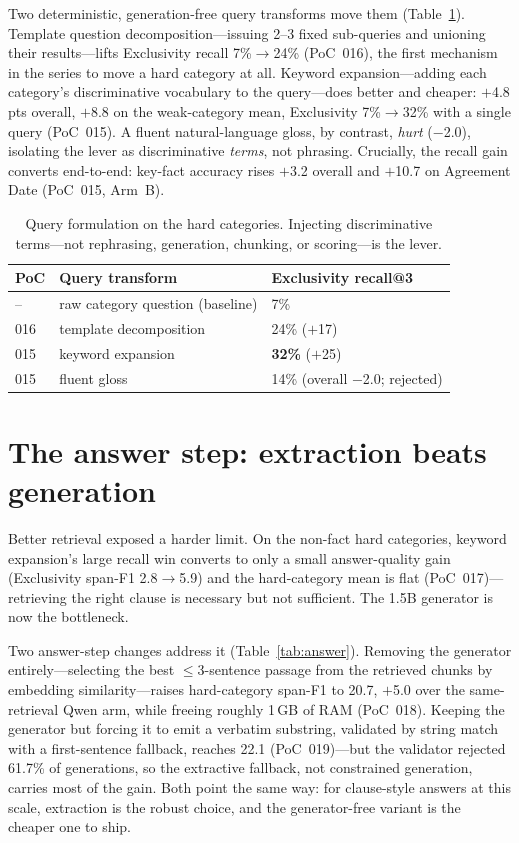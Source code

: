 \documentclass[11pt]{article}
\newcommand{\poc}[1]{PoC~#1}
\begin{document}
Two deterministic, generation-free query transforms move them (Table~\ref{tab:query}).
Template question decomposition---issuing 2--3 fixed sub-queries and unioning their
results---lifts Exclusivity recall 7\%$\rightarrow$24\% (\poc{016}), the first mechanism in the
series to move a hard category at all. Keyword expansion---adding each category's
discriminative vocabulary to the query---does better and cheaper: $+$4.8 pts overall,
$+$8.8 on the weak-category mean, Exclusivity 7\%$\rightarrow$32\% with a single query
(\poc{015}). A fluent natural-language gloss, by contrast, \emph{hurt} ($-$2.0), isolating the
lever as discriminative \emph{terms}, not phrasing. Crucially, the recall gain converts
end-to-end: key-fact accuracy rises $+$3.2 overall and $+$10.7 on Agreement Date (\poc{015},
Arm~B).

\begin{table}[t]
\centering
\small
\begin{tabular}{l l l}
\toprule
PoC & Query transform & Exclusivity recall@3 \\
\midrule
--  & raw category question (baseline) & 7\% \\
016 & template decomposition          & 24\% ($+$17) \\
015 & keyword expansion               & \textbf{32\%} ($+$25) \\
015 & fluent gloss                    & 14\% (overall $-$2.0; rejected) \\
\bottomrule
\end{tabular}
\caption{Query formulation on the hard categories. Injecting discriminative terms---not
rephrasing, generation, chunking, or scoring---is the lever.}
\label{tab:query}
\end{table}

\section{The answer step: extraction beats generation}\label{sec:answer}
Better retrieval exposed a harder limit. On the non-fact hard categories, keyword expansion's
large recall win converts to only a small answer-quality gain (Exclusivity span-F1
2.8$\rightarrow$5.9) and the hard-category mean is flat (\poc{017})---retrieving the right
clause is necessary but not sufficient. The 1.5B generator is now the bottleneck.

Two answer-step changes address it (Table~\ref{tab:answer}). Removing the generator
entirely---selecting the best $\leq$3-sentence passage from the retrieved chunks by
embedding similarity---raises hard-category span-F1 to 20.7, $+$5.0 over the same-retrieval
Qwen arm, while freeing roughly 1\,GB of RAM (\poc{018}). Keeping the generator but forcing it
to emit a verbatim substring, validated by string match with a first-sentence fallback,
reaches 22.1 (\poc{019})---but the validator rejected 61.7\% of generations, so the extractive
fallback, not constrained generation, carries most of the gain. Both point the same way: for
clause-style answers at this scale, extraction is the robust choice, and the generator-free
variant is the cheaper one to ship.
\end{document}
